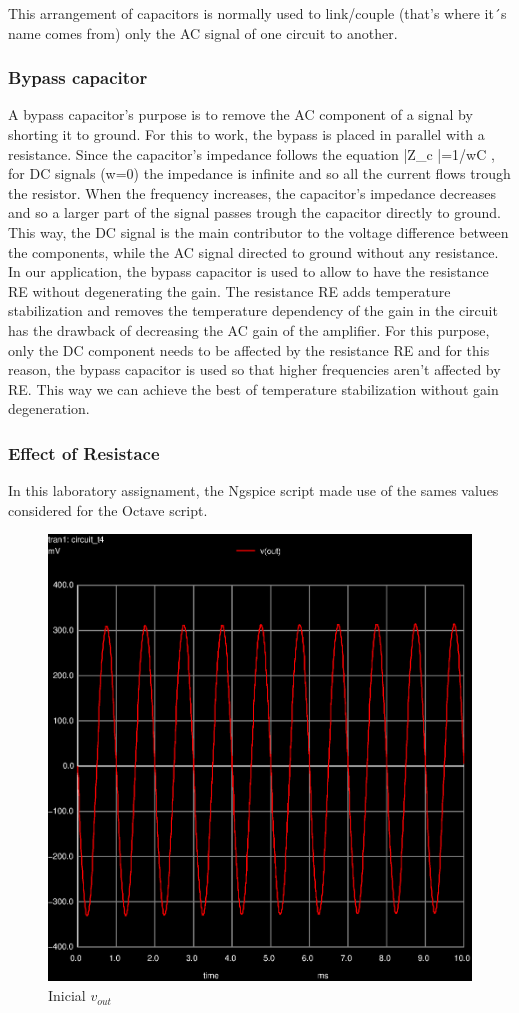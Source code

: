 This arrangement of capacitors is normally used to link/couple (that’s where it´s name comes from) only the AC signal of one circuit to another.

\subsubsection{Bypass capacitor}

A bypass capacitor’s purpose is to remove the AC component of a signal by shorting it to ground.
For this to work, the bypass is placed in parallel with a resistance. Since the capacitor’s impedance follows the equation |Z_c |=1/wC , for DC signals (w=0) the impedance is infinite and so all the current flows trough the resistor. When the frequency increases, the capacitor’s impedance decreases and so a larger part of the signal passes trough the capacitor directly to ground. This way, the DC signal is the main contributor to the voltage difference between the components, while the AC signal directed to ground without any resistance.
In our application, the bypass capacitor is used to allow to have the resistance RE without degenerating the gain. The resistance RE adds temperature stabilization and removes the temperature dependency of the gain in the circuit has the drawback of decreasing the AC gain of the amplifier. For this purpose, only the DC component needs to be affected by the resistance RE and for this reason, the bypass capacitor is used so that higher frequencies aren’t affected by RE. This way we can achieve the best of temperature stabilization without gain degeneration.

\subsubsection{Effect of Resistace }


In this laboratory assignament, the Ngspice script made use of the sames values considered for
the Octave script.


\begin{figure}[ht]
	\centering
	\includegraphics[width=0.6\linewidth]{vo1.eps}
	\caption{Inicial $v_{out}$}
\label{fig:graph_global}
\end{figure}

